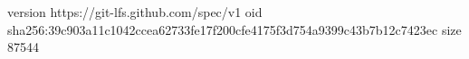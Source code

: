 version https://git-lfs.github.com/spec/v1
oid sha256:39c903a11c1042ccea62733fe17f200cfe4175f3d754a9399c43b7b12c7423ec
size 87544
